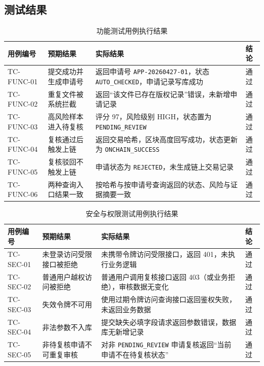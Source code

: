 \documentclass[UTF8,a4paper,12pt]{ctexart}
\begin{document}
\subsection{测试结果}
\begin{table}[H]
  \centering
  \caption{功能测试用例执行结果}
  \setlength{\tabcolsep}{3pt}
  \begin{tabularx}{0.94\textwidth}{p{} p{} p{} p{}}
    \toprule
    用例编号 & 预期结果 & 实际结果 & 结论 \\
    \midrule
    TC-FUNC-01 & 提交成功并生成申请号 & 返回申请号 \texttt{APP-20260427-01}，状态 \texttt{AUTO\_CHECKED}，申请记录写库成功 & 通过 \\
    TC-FUNC-02 & 重复文件被系统拦截 & 返回“该文件已存在版权记录”错误，未新增申请记录 & 通过 \\
    TC-FUNC-03 & 高风险样本进入待复核 & 评分 97，风险级别 HIGH，状态置为 \texttt{PENDING\_REVIEW} & 通过 \\
    TC-FUNC-04 & 复核通过后触发上链 & 返回交易哈希，区块高度回写成功，状态更新为 \texttt{ONCHAIN\_SUCCESS} & 通过 \\
    TC-FUNC-05 & 复核驳回不触发上链 & 申请状态为 \texttt{REJECTED}，未生成链上交易记录 & 通过 \\
    TC-FUNC-06 & 两种查询入口结果一致 & 按哈希与按申请号查询返回的状态、风险与证据摘要一致 & 通过 \\
    \bottomrule
  \end{tabularx}
\end{table}

\begin{table}[H]
  \centering
  \caption{安全与权限测试用例执行结果}
  \setlength{\tabcolsep}{3pt}
  \begin{tabularx}{0.94\textwidth}{p{} p{} p{} p{}}
    \toprule
    用例编号 & 预期结果 & 实际结果 & 结论 \\
    \midrule
    TC-SEC-01 & 未登录访问受限接口被拒绝 & 未携带令牌访问受限接口，返回 401，未执行业务逻辑 & 通过 \\
    TC-SEC-02 & 普通用户越权访问被拒绝 & 普通用户调用复核接口返回 403（或业务拒绝），审核数据无变化 & 通过 \\
    TC-SEC-03 & 失效令牌不可用 & 使用过期令牌访问查询接口返回鉴权失败，未返回业务数据 & 通过 \\
    TC-SEC-04 & 非法参数不入库 & 提交缺失必填字段请求返回参数错误，数据库无新增记录 & 通过 \\
    TC-SEC-05 & 非待复核申请不可重复审核 & 对非 \texttt{PENDING\_REVIEW} 申请复核返回“当前申请不在待复核状态” & 通过 \\
    \bottomrule
  \end{tabularx}
\end{table}
\end{document}
